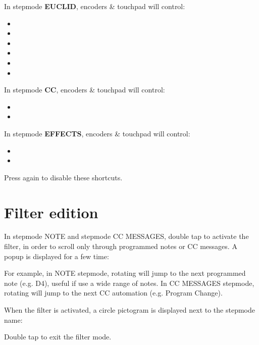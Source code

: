 In stepmode \textbf{EUCLID}, encoders \& touchpad will control:

\begin{itemize}
\item {}
\item {}
\item {}
\item {}
\item {}
\item {}
\end{itemize}

In stepmode \textbf{CC}, encoders \& touchpad will control:

\begin{itemize}
\item {}
\item {}
\end{itemize}

In stepmode \textbf{EFFECTS}, encoders \& touchpad will control:

\begin{itemize}
\item {}
\item {}
\end{itemize}


Press  again to disable these shortcuts.


\section{Filter edition}

In stepmode NOTE and stepmode CC MESSAGES, double tap  to activate the filter, in order to scroll only through programmed notes or CC messages. A popup is displayed for a few time:


For example, in NOTE stepmode, rotating \encodericon{} will jump to the next programmed note (e.g. D4), useful if use a wide range of notes. In CC MESSAGES stepmode, rotating \encodericon{} will jump to the next CC automation (e.g. Program Change).

When the filter is activated, a circle pictogram is displayed next to the stepmode name:


Double tap  to exit the filter mode.
